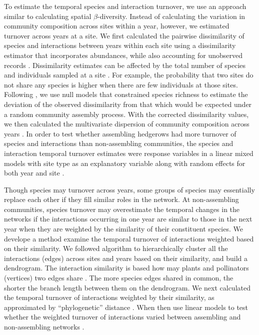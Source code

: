\documentclass[12pt]{article}
\begin{document}
To estimate the temporal species and interaction turnover, we use an
approach similar to calculating spatial $\beta$-diversity. Instead of
calculating the variation in community composition across sites within
a year, however, we estimated turnover across years at a site. We
first calculated the pairwise dissimilarity of species and
interactions between years within each site using a dissimilarity
estimator that incorporates abundances, while also accounting for
unobserved records \citep{chao-2005-148}. Dissimilarity estimates can
be affected by the total number of species and individuals sampled at
a site \citep[e.g.,][]{ponisio2015farm}. For example, the probability
that two sites do not share any species is higher when there are few
individuals at those sites. Following \cite{ponisio2015farm}, we use
null models that constrained species richness to estimate the
deviation of the observed dissimilarity from that which would be
expected under a random community assembly process. With the corrected
dissimilarity values, we then calculated the multivariate dispersion
of community composition across years \citep{anderson-2011-19}. In
order to test whether assembling hedgerows had more turnover of
species and interactions than non-assembling communities, the species
and interaction temporal turnover estimates were response variables in
a linear mixed models with site type as an explanatory variable along
with random effects for both year and site \citep{lme4, lmetest}.

Though species may turnover across years, some groups of species may
essentially replace each other if they fill similar roles in the
network. At non-assembling communities, species turnover may
overestimate the temporal changes in the networks if the interactions
occurring in one year are similar to those in the next year when they
are weighted by the similarity of their constituent species. We
develope a method examine the temporal turnover of interactions
weighted based on their similarity. We followed \cite{ahn2010link}
algorithm to hierarchically cluster all the interactions (edges)
across sites and years based on their similarity, and build a
dendrogram. The interaction similarity is based how may plants and
pollinators (vertices) two edges share \citep{ahn2010link,
  kalinka2011linkcomm}. The more species edges shared in common, the
shorter the branch length between them on the dendrogram.  We next
calculated the temporal turnover of interactions weighted by their
similarity, as approximated by ``phylogenetic'' distance
\citep{graham2008phylogenetic, picante-2010-1463}. When then use
linear models to test whether the weighted turnover of interactions
varied between assembling and non-assembling networks \citep{lme4,
  lmetest}.
\end{document}
